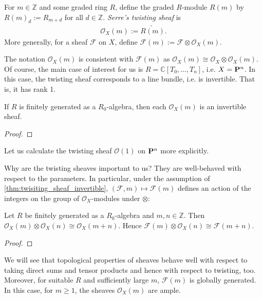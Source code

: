 \documentclass[12pt]{ociamthesis}  %
\begin{document}
\begin{definition}
  For $m\in\mathbb{Z}$ and some graded ring $R$, define the graded
  $R$-module $R(m)$ by $R(m)_d := R_{m+d}$ for all $d\in\mathbb{Z}$. \emph{Serre's
    twisting sheaf} is
  \begin{align*}
    \mathscr O_X(m) := \widetilde{R(m)}.
  \end{align*}
  More generally, for a sheaf $\mathscr F$ on $X$, define
  $\mathscr F(m) := \mathscr F \otimes \mathscr O_X(m)$.
\end{definition}
The notation $\mathscr O_X(m)$ is consistent with $\mathscr F(m)$
as $\mathscr O_X(m) \cong \mathscr O_X \otimes \mathscr O_X(m)$.
Of course, the main case of interest for us is
$R=\mathbb{C}[T_0,\ldots,T_n]$, i.e. $X=\mathbf{P}^{n}_{}$.
In this case, the twisting sheaf corresponds to a line bundle,
i.e. is invertible. That is, it has rank 1.

\begin{proposition}
  \label{thm:twisiting_sheaf_invertible}
  If $R$ is finitely generated as a $R_0$-algebra, then each
  $\mathscr O_X(m)$ is an invertible sheaf.
  \begin{proof}
    \missingproof
  \end{proof}
\end{proposition}

\begin{example}
  Let us calculate the twisting sheaf $\mathscr O(1)$ on $\mathbf{P}^{n}_{}$
  more explicitly.
  \missingexample
\end{example}

Why are the twisting sheaves important to us? They are well-behaved
with respect to the parameters. In particular,
under the assumption of \ref{thm:twisiting_sheaf_invertible},
$(\mathscr F,m)\mapsto \mathscr F(m)$ defines an action of
the integers on the group of $\mathscr O_X$-modules under
$\otimes$:

\begin{lemma}\label{lem:additivity_twisting_sheaf}
  Let $R$ be finitely generated as a $R_0$-algebra and $m,n\in\mathbb{Z}$.
  Then $\mathscr O_X(m) \otimes \mathscr O_X(n) \cong \mathscr O_X(m + n)$. Hence
  $\mathscr F(m) \otimes \mathscr O_X(n) \cong \mathscr F(m+n)$.
  \begin{proof}
    \missingproof
  \end{proof}
\end{lemma}

We will see that topological properties of sheaves behave well
with respect to taking direct sums and tensor products and hence
with respect to twisting, too. Moreover, for suitable $R$ and
sufficiently large $m$, $\mathscr F(m)$ is globally generated. In this
case, for $m\geq 1$, the sheaves $\mathscr O_X(m)$ are ample.
\end{document}
